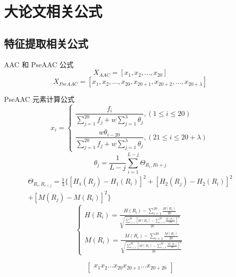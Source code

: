 \section[大论文的相关公式]{大论文相关公式}

\subsection{特征提取相关公式}
AAC 和 PseAAC 公式
\begin{equation}
    X_{AAC}=\left [ x_{1},x_{2},...,x_{20} \right ]
\end{equation}
\begin{equation}
    X_{PseAAC}=\left [ x_{1},x_{2},...,x_{20},x_{20+1},x_{20+2},...,x_{20+\lambda}\right ]
\end{equation}

PseAAC 元素计算公式\cite{chou_prediction_2001}
\begin{equation}
    x_{i}=\begin{cases}
        \dfrac{f_{i}}{\sum_{j=1}^{20}f_{j}+w\sum_{j=1}^{\lambda}\theta_{j}},\left ( 1 \leq i \leq 20 \right ) \\
        \dfrac{w\theta_{i-20}}{\sum_{j=1}^{20}f_{j}+w\sum_{j=1}^{\lambda}\theta_{j}},\left ( 21\leq i \leq 20+\lambda \right )
    \end{cases}
\end{equation}
\begin{equation}
    \theta_{j}=\frac{1}{L-j}\sum_{i=1}^{L-j}\Theta_{R_{i},R{i+j}}
\end{equation}
\begin{multline}
    \Theta_{R_{i},R_{i+j}}=\frac{1}{3} \{ \left[ H_{1}(R_{j}) - H_{1}(R_{i}) \right]^2 + \left[ H_{2}(R_{j}) - H_{2}(R_{i}) \right]^2 \\
    + \left[ M(R_{j}) - M(R_{i}) \right]^2 \}
\end{multline}
\begin{equation}
    \begin{cases}
        H(R_{i})=\frac{H(R_{i})-\sum_{i=1}^{20}\frac{H(R_{i})}{20}}{\sqrt{\frac{\sum_{i=1}^{20}\left[ H(R_{i})- \sum_{i=1}^{20}\frac{H(R_{i})}{20}\right]^2}{20}}} \\
        M(R_{i})=\frac{M(R_{i})-\sum_{i=1}^{20}\frac{M(R_{i})}{20}}{\sqrt{\frac{\sum_{i=1}^{20}\left[ M(R_{i})- \sum_{i=1}^{20}\frac{M(R_{i})}{20}\right]^2}{20}}}
    \end{cases}
\end{equation}

\begin{equation}
    \begin{bmatrix}
        x_{1}  x_{2} \ldots x_{20}  x_{20+1} \ldots x_{20+20}
    \end{bmatrix}    
\end{equation}

